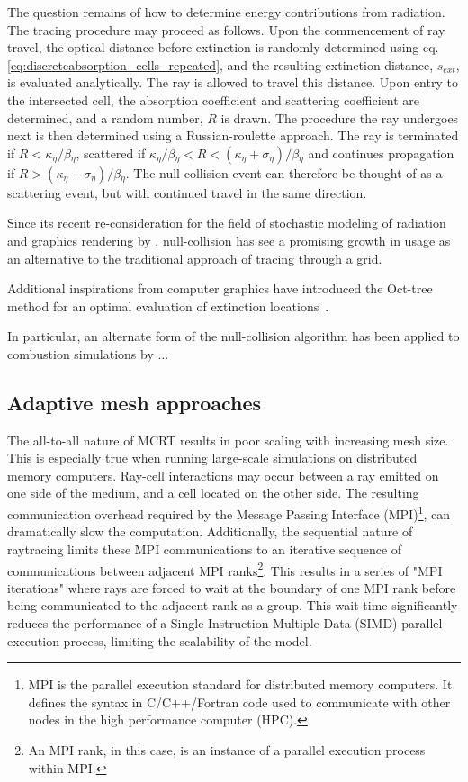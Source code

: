 The question remains of how to determine energy contributions from radiation. 
The tracing procedure may proceed as follows. Upon the commencement of ray travel, the optical distance before extinction is randomly determined using eq. \ref{eq:discreteabsorption_cells_repeated}, and the resulting extinction distance, $s_{ext}$, is evaluated analytically.
The ray is allowed to travel this distance. Upon entry to the intersected cell, the absorption coefficient and scattering coefficient are determined, and a random number, $R$ is drawn.
The procedure the ray undergoes next is then determined using a Russian-roulette approach.
The ray is terminated if $R<\kappa{}_\eta{}/\beta{}_\eta{}$, scattered if $\kappa{}_\eta{}/\beta{}_\eta{}<R<(\kappa{}_\eta{}+\sigma{}_\eta{})/\beta{}_\eta{}$ and continues propagation if $R>(\kappa{}_\eta{}+\sigma{}_\eta{})/\beta{}_\eta{}$. 
The null collision event can therefore be thought of as a scattering event, but with continued travel in the same direction.

Since its recent re-consideration for the field of stochastic modeling of radiation and graphics rendering by \citet{Galtier2013IntegralAlgorithms}, null-collision has see a promising growth in usage as an alternative to the traditional approach of tracing through a grid. 

Additional inspirations from computer graphics have introduced the Oct-tree method for an optimal evaluation of extinction locations~\cite{Villefranque2019AAtmospheres}.

In particular, an alternate form of the null-collision algorithm has been applied to combustion simulations by \citet{Eymet2013Null-collisionSimulators}...


\subsection{Adaptive mesh approaches}
The all-to-all nature of MCRT results in poor scaling with increasing mesh size. 
This is especially true when running large-scale simulations on distributed memory computers.
Ray-cell interactions may occur between a ray emitted on one side of the medium, and a cell located on the other side.
The resulting communication overhead required by the Message Passing Interface (MPI)\footnote{MPI is the parallel execution standard for distributed memory computers. It defines the syntax in C/C++/Fortran code used to communicate with other nodes in the high performance computer (HPC).}, can dramatically slow the computation. Additionally, the sequential nature of raytracing limits these MPI communications to an iterative sequence of communications between adjacent MPI ranks\footnote{An MPI rank, in this case, is an instance of a parallel execution process within MPI.}.
This results in a series of "MPI iterations" where rays are forced to wait at the boundary of one MPI rank before being communicated to the adjacent rank as a group. This wait time significantly reduces the performance of a Single Instruction Multiple Data (SIMD) parallel execution process, limiting the scalability of the model.

